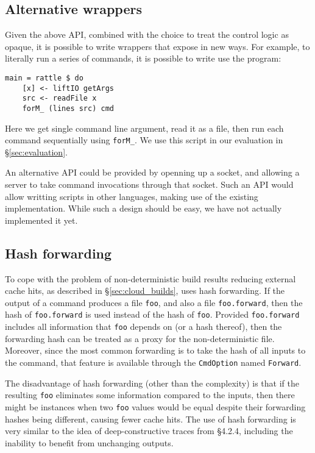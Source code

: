 \subsection{Alternative \Rattle wrappers}

Given the above API, combined with the choice to treat the control logic as opaque, it is possible to write wrappers that expose \Rattle in new ways. For example, to literally run a series of commands, it is possible to write use the \Rattle program:

\vspace{3mm}
\begin{verbatim}
main = rattle $ do
    [x] <- liftIO getArgs
    src <- readFile x
    forM_ (lines src) cmd
\end{verbatim}
\vspace{3mm}

Here we get single command line argument, read it as a file, then run each command sequentially using \texttt{forM\_}. We use this script in our evaluation in \S\ref{sec:evaluation}.

An alternative API could be provided by openning up a socket, and allowing a \Rattle server to take command invocations through that socket. Such an API would allow writting \Rattle scripts in other languages, making use of the existing \Rattle implementation. While such a design should be easy, we have not actually implemented it yet.

\subsection{Hash forwarding}
\label{sec:forward_hashes}

To cope with the problem of non-deterministic build results reducing external cache hits, as described in \S\ref{sec:cloud_builds}, \Rattle uses hash forwarding. If the output of a command produces a file \texttt{foo}, and also a file \texttt{foo.forward}, then the hash of \texttt{foo.forward} is used instead of the hash of \texttt{foo}. Provided \texttt{foo.forward} includes all information that \texttt{foo} depends on (or a hash thereof), then the forwarding hash can be treated as a proxy for the non-deterministic file. Moreover, since the most common forwarding is to take the hash of all inputs to the command, that feature is available through the \texttt{CmdOption} named \texttt{Forward}.

The disadvantage of hash forwarding (other than the complexity) is that if the resulting \texttt{foo} eliminates some information compared to the inputs, then there might be instances when two \texttt{foo} values would be equal despite their forwarding hashes being different, causing fewer cache hits. The use of hash forwarding is very similar to the idea of deep-constructive traces from \citet{build_systems_a_la_carte} \S4.2.4, including the inability to benefit from unchanging outputs.

